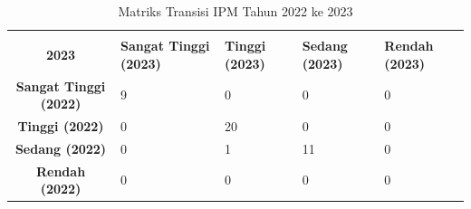 \begin{table}[H]
\centering
\caption{Matriks Transisi IPM Tahun 2022 ke 2023} \label{tab:ipm_transisi_2022_2023}
\begin{tabular}{|c|p{2cm}|p{2cm}|p{2cm}|p{2cm}|}
\hline
\makecell{\textbf{Tahun 2022} \\ \textbf{2023}} & \textbf{Sangat Tinggi (2023)} & \textbf{Tinggi (2023)} & \textbf{Sedang (2023)} & \textbf{Rendah (2023)} \\ \hline
\textbf{Sangat Tinggi (2022)} & 9 & 0 & 0 & 0 \\ \hline
\textbf{Tinggi (2022)} & 0 & 20 & 0 & 0 \\ \hline
\textbf{Sedang (2022)} & 0 & 1 & 11 & 0 \\ \hline
\textbf{Rendah (2022)} & 0 & 0 & 0 & 0 \\ \hline
\end{tabular}
\end{table}